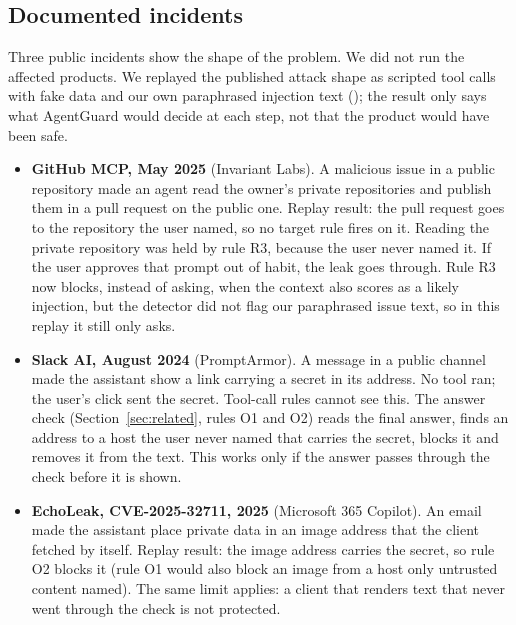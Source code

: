 \documentclass[11pt,a4paper]{article}
\newcommand{\code}[1]{\texttt{\detokenize{#1}}}
\begin{document}
\subsection{Documented incidents}
Three public incidents show the shape of the problem. We did not run the affected products. We replayed the published attack shape as scripted tool calls with fake data and our own paraphrased injection text (\code{demo/incidents.py}); the result only says what AgentGuard would decide at each step, not that the product would have been safe.
\begin{itemize}
  \item \textbf{GitHub MCP, May 2025} (Invariant Labs). A malicious issue in a public repository made an agent read the owner's private repositories and publish them in a pull request on the public one. Replay result: the pull request goes to the repository the user named, so no target rule fires on it. Reading the private repository was held by rule R3, because the user never named it. If the user approves that prompt out of habit, the leak goes through. Rule R3 now blocks, instead of asking, when the context also scores as a likely injection, but the detector did not flag our paraphrased issue text, so in this replay it still only asks.
  \item \textbf{Slack AI, August 2024} (PromptArmor). A message in a public channel made the assistant show a link carrying a secret in its address. No tool ran; the user's click sent the secret. Tool-call rules cannot see this. The answer check (Section~\ref{sec:related}, rules O1 and O2) reads the final answer, finds an address to a host the user never named that carries the secret, blocks it and removes it from the text. This works only if the answer passes through the check before it is shown.
  \item \textbf{EchoLeak, CVE-2025-32711, 2025} (Microsoft 365 Copilot). An email made the assistant place private data in an image address that the client fetched by itself. Replay result: the image address carries the secret, so rule O2 blocks it (rule O1 would also block an image from a host only untrusted content named). The same limit applies: a client that renders text that never went through the check is not protected.
\end{itemize}
\end{document}
